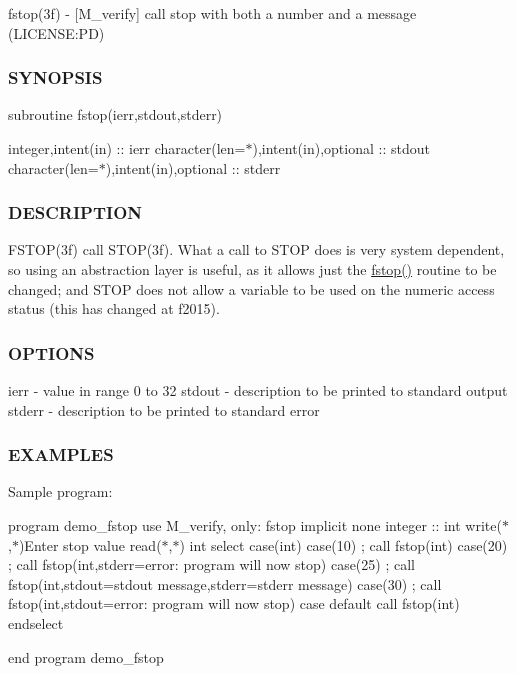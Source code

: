 fstop(3f) -\/ \mbox{[}M\+\_\+verify\mbox{]} call stop with both a number and a message (L\+I\+C\+E\+N\+SE\+:PD) \subsubsection*{S\+Y\+N\+O\+P\+S\+IS}

subroutine fstop(ierr,stdout,stderr)

integer,intent(in) \+:\+: ierr character(len=$\ast$),intent(in),optional \+:\+: stdout character(len=$\ast$),intent(in),optional \+:\+: stderr \subsubsection*{D\+E\+S\+C\+R\+I\+P\+T\+I\+ON}

F\+S\+T\+O\+P(3f) call S\+T\+O\+P(3f). What a call to S\+T\+OP does is very system dependent, so using an abstraction layer is useful, as it allows just the \mbox{\hyperlink{namespacem__verify_a2695833d468118d68918d6aeabab6d0b}{fstop()}} routine to be changed; and S\+T\+OP does not allow a variable to be used on the numeric access status (this has changed at f2015).

\subsubsection*{O\+P\+T\+I\+O\+NS}

ierr -\/ value in range 0 to 32 stdout -\/ description to be printed to standard output stderr -\/ description to be printed to standard error \subsubsection*{E\+X\+A\+M\+P\+L\+ES}

Sample program\+:

program demo\+\_\+fstop use M\+\_\+verify, only\+: fstop implicit none integer \+:\+: int write($\ast$,$\ast$)\textquotesingle{}Enter stop value\textquotesingle{} read($\ast$,$\ast$) int select case(int) case(10) ; call fstop(int) case(20) ; call fstop(int,stderr=\textquotesingle{}error\+: program will now stop\textquotesingle{}) case(25) ; call fstop(int,stdout=\textquotesingle{}stdout message\textquotesingle{},stderr=\textquotesingle{}stderr message\textquotesingle{}) case(30) ; call fstop(int,stdout=\textquotesingle{}error\+: program will now stop\textquotesingle{}) case default call fstop(int) endselect

end program demo\+\_\+fstop

